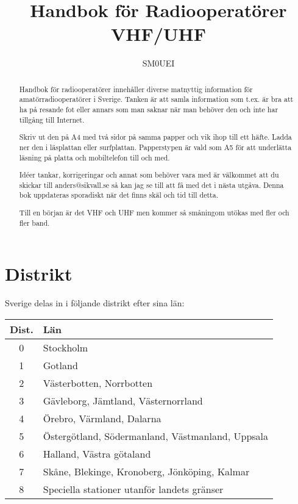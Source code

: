 \documentclass[12pt,swedish,a4paper]{article}
\begin{document}
\title{Handbok för Radiooperatörer\\
VHF/UHF}
\author{SM0UEI}
\maketitle

\begin{abstract}
Handbok för radiooperatörer innehåller diverse matnyttig information för amatörradiooperatörer i Sverige. Tanken är att samla information som t.ex. är bra att ha på resande fot eller annars som man saknar när man behöver den och inte har tillgång till Internet.

Skriv ut den på A4 med två sidor på samma papper och vik ihop till ett häfte. Ladda ner den i läsplattan eller surfplattan. Papperstypen är vald som A5 för att underlätta läsning på platta och mobiltelefon till och med.

Idéer tankar, korrigeringar och annat som behöver vara med är välkommet att du skickar till anders@sikvall.se så kan jag se till att få med det i nästa utgåva. Denna bok uppdateras sporadiskt när det finns skäl och tid till detta.

Till en början är det VHF och UHF men kommer så småningom utökas med fler och fler band.
\end{abstract}

\clearpage
\tableofcontents
\clearpage

\setlength{\parskip}{0.5em}
\setlength{\parindent}{0pt}


\section{Distrikt}

Sverige delas in i följande distrikt efter sina län:

\begin{tabular}{cl}
	\textbf{Dist.} & \textbf{Län}                                     \\ \hline
	      0        & Stockholm                                        \\
	      1        & Gotland                                          \\
	      2        & Västerbotten, Norrbotten                         \\
	      3        & Gävleborg, Jämtland, Västernorrland              \\
	      4        & Örebro, Värmland, Dalarna                        \\
	      5        & Östergötland, Södermanland, Västmanland, Uppsala \\
	      6        & Halland, Västra götaland                         \\
	      7        & Skåne, Blekinge, Kronoberg, Jönköping, Kalmar    \\
	      8        & Speciella stationer utanför landets gränser
\end{tabular}
\end{document}
